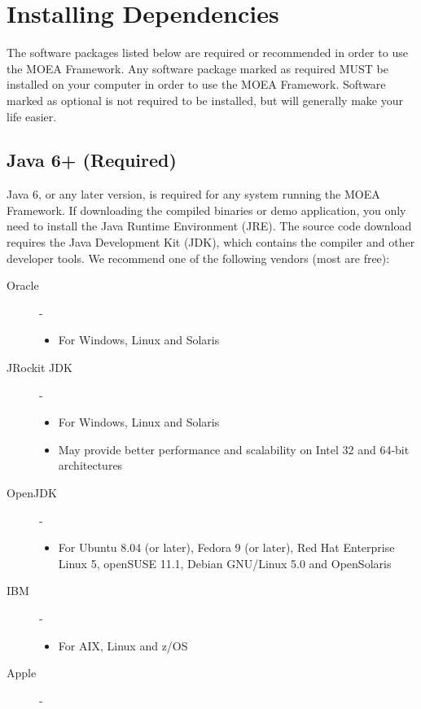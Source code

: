 \section{Installing Dependencies}

The software packages listed below are required or recommended in order to use the MOEA Framework.  Any software package marked as required MUST be installed on your computer in order to use the MOEA Framework.  Software marked as optional is not required to be installed, but will generally make your life easier.

\subsection{Java 6+ (Required)}
Java 6, or any later version, is required for any system running the MOEA Framework.  If downloading the compiled binaries or demo application, you only need to install the Java Runtime Environment (JRE).  The source code download requires the Java Development Kit (JDK), which contains the compiler and other developer tools.  We recommend one of the following vendors (most are free):

\begin{description}
  \item[Oracle] - 
    \begin{itemize}
      \item For Windows, Linux and Solaris
    \end{itemize}
    
  \item[JRockit JDK] - 
    \begin{itemize}
      \item For Windows, Linux and Solaris
      \item May provide better performance and scalability on Intel 32 and 64-bit architectures
    \end{itemize}

  \item[OpenJDK] - 
    \begin{itemize}
      \item For Ubuntu 8.04 (or later), Fedora 9 (or later), Red Hat Enterprise Linux 5, openSUSE 11.1, Debian GNU/Linux 5.0 and OpenSolaris
    \end{itemize}

  \item[IBM] - 
    \begin{itemize}
      \item For AIX, Linux and z/OS
    \end{itemize}
  \item[Apple] - 
\end{description}

